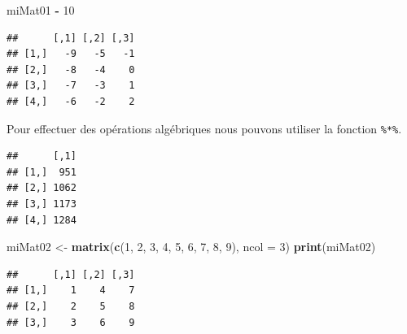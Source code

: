 \documentclass[
]{book}
\newenvironment{Shaded}{\begin{snugshade}}{\end{snugshade}}
\newcommand{\CommentTok}[1]{\textcolor[rgb]{0.56,0.35,0.01}{\textit{#1}}}
\newcommand{\DataTypeTok}[1]{\textcolor[rgb]{0.13,0.29,0.53}{#1}}
\newcommand{\DecValTok}[1]{\textcolor[rgb]{0.00,0.00,0.81}{#1}}
\newcommand{\KeywordTok}[1]{\textcolor[rgb]{0.13,0.29,0.53}{\textbf{#1}}}
\newcommand{\NormalTok}[1]{#1}
\newcommand{\OperatorTok}[1]{\textcolor[rgb]{0.81,0.36,0.00}{\textbf{#1}}}
\newcommand{\StringTok}[1]{\textcolor[rgb]{0.31,0.60,0.02}{#1}}
\begin{document}
\begin{Shaded}
\begin{Highlighting}[]
\NormalTok{miMat01 }\OperatorTok{-}\StringTok{ }\DecValTok{10}
\end{Highlighting}
\end{Shaded}

\begin{verbatim}
##      [,1] [,2] [,3]
## [1,]   -9   -5   -1
## [2,]   -8   -4    0
## [3,]   -7   -3    1
## [4,]   -6   -2    2
\end{verbatim}

Pour effectuer des opérations algébriques nous pouvons utiliser la fonction \texttt{\%*\%}.

\begin{Shaded}
\end{Shaded}

\begin{verbatim}
##      [,1]
## [1,]  951
## [2,] 1062
## [3,] 1173
## [4,] 1284
\end{verbatim}

\begin{Shaded}
\begin{Highlighting}[]
\NormalTok{miMat02 <-}\StringTok{ }\KeywordTok{matrix}\NormalTok{(}\KeywordTok{c}\NormalTok{(}\DecValTok{1}\NormalTok{, }\DecValTok{2}\NormalTok{, }\DecValTok{3}\NormalTok{, }\DecValTok{4}\NormalTok{, }\DecValTok{5}\NormalTok{, }\DecValTok{6}\NormalTok{, }\DecValTok{7}\NormalTok{, }\DecValTok{8}\NormalTok{, }\DecValTok{9}\NormalTok{), }\DataTypeTok{ncol =} \DecValTok{3}\NormalTok{)}
\KeywordTok{print}\NormalTok{(miMat02)}
\end{Highlighting}
\end{Shaded}

\begin{verbatim}
##      [,1] [,2] [,3]
## [1,]    1    4    7
## [2,]    2    5    8
## [3,]    3    6    9
\end{verbatim}

\begin{Shaded}
\end{Shaded}
\end{document}
